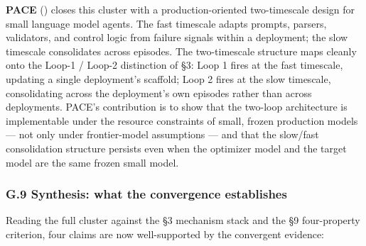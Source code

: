 \documentclass[
]{article}
\begin{document}
\textbf{PACE} () closes
this cluster with a production-oriented two-timescale design for small
language model agents. The fast timescale adapts prompts, parsers,
validators, and control logic from failure signals within a deployment;
the slow timescale consolidates across episodes. The two-timescale
structure maps cleanly onto the Loop-1 / Loop-2 distinction of §3: Loop
1 fires at the fast timescale, updating a single deployment's scaffold;
Loop 2 fires at the slow timescale, consolidating across the
deployment's own episodes rather than across deployments. PACE's
contribution is to show that the two-loop architecture is implementable
under the resource constraints of small, frozen production models ---
not only under frontier-model assumptions --- and that the slow/fast
consolidation structure persists even when the optimizer model and the
target model are the same frozen small model.

\subsubsection{G.9 Synthesis: what the convergence
establishes}\label{g.9-synthesis-what-the-convergence-establishes}

Reading the full cluster against the §3 mechanism stack and the §9
four-property criterion, four claims are now well-supported by the
convergent evidence:
\end{document}
